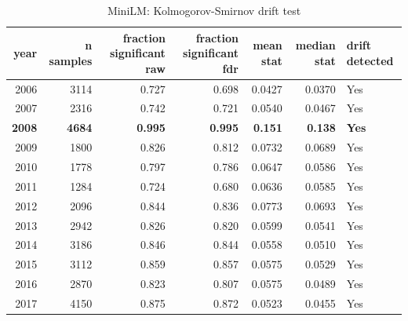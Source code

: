 \begin{table}[ht]
\centering
\caption{MiniLM: Kolmogorov-Smirnov drift test}
\label{tab:minilm_ks}
\begin{tabular}{rrrrrrl}
\toprule
year & n samples & fraction significant raw & fraction significant fdr & mean stat & median stat & drift detected \\
\midrule
2006 & 3114 & 0.727 & 0.698 & 0.0427 & 0.0370 & Yes \\
2007 & 2316 & 0.742 & 0.721 & 0.0540 & 0.0467 & Yes \\
\textbf{2008} & \textbf{4684} & \textbf{0.995} & \textbf{0.995} & \textbf{0.151} & \textbf{0.138} & \textbf{Yes} \\
2009 & 1800 & 0.826 & 0.812 & 0.0732 & 0.0689 & Yes \\
2010 & 1778 & 0.797 & 0.786 & 0.0647 & 0.0586 & Yes \\
2011 & 1284 & 0.724 & 0.680 & 0.0636 & 0.0585 & Yes \\
2012 & 2096 & 0.844 & 0.836 & 0.0773 & 0.0693 & Yes \\
2013 & 2942 & 0.826 & 0.820 & 0.0599 & 0.0541 & Yes \\
2014 & 3186 & 0.846 & 0.844 & 0.0558 & 0.0510 & Yes \\
2015 & 3112 & 0.859 & 0.857 & 0.0575 & 0.0529 & Yes \\
2016 & 2870 & 0.823 & 0.807 & 0.0575 & 0.0489 & Yes \\
2017 & 4150 & 0.875 & 0.872 & 0.0523 & 0.0455 & Yes \\
\bottomrule
\end{tabular}
\end{table}
